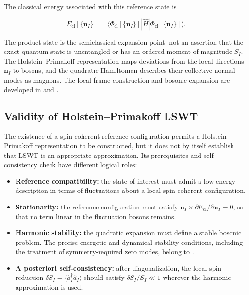 The classical energy associated with this reference state is

\[
E_{\mathrm{cl}}[\{\mathbf n_I\}]
=
\langle\Phi_{\mathrm{cl}}[\{\mathbf n_I\}]|
\hat H
|\Phi_{\mathrm{cl}}[\{\mathbf n_I\}]\rangle.
\]

The product state is the semiclassical expansion point, not an assertion that the exact quantum state is unentangled or has an ordered moment of magnitude \(S_I\). The Holstein--Primakoff representation maps deviations from the local directions \(\mathbf n_I\) to bosons, and the quadratic Hamiltonian describes their collective normal modes as magnons. The local-frame construction and bosonic expansion are developed in  and .

\subsection{Validity of Holstein--Primakoff LSWT}

The existence of a spin-coherent reference configuration permits a Holstein--Primakoff representation to be constructed, but it does not by itself establish that LSWT is an appropriate approximation. Its prerequisites and self-consistency check have different logical roles:

\begin{itemize}
\tightlist
\item
  \textbf{Reference compatibility:} the state of interest must admit a low-energy description in terms of fluctuations about a local spin-coherent configuration.
\item
  \textbf{Stationarity:} the reference configuration must satisfy \(\mathbf n_I\times\partial E_{\mathrm{cl}}/\partial\mathbf n_I=0\), so that no term linear in the fluctuation bosons remains.
\item
  \textbf{Harmonic stability:} the quadratic expansion must define a stable bosonic problem. The precise energetic and dynamical stability conditions, including the treatment of symmetry-required zero modes, belong to .
\item
  \textbf{A posteriori self-consistency:} after diagonalization, the local spin reduction \(\delta S_I=\langle\hat a_I^\dagger\hat a_I\rangle\) should satisfy \(\delta S_I/S_I\ll1\) wherever the harmonic approximation is used.
\end{itemize}

